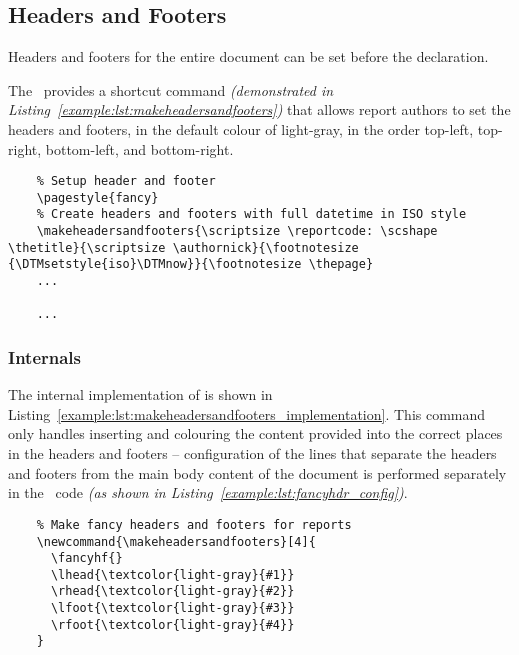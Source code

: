 \subsection{Headers and Footers}
Headers and footers for the entire document can be set before the  declaration.

The \uswdwmspkg\ provides a shortcut command \textit{(demonstrated in Listing~\ref{example:lst:makeheadersandfooters})} that allows report authors to set the headers and footers, in the default colour of \textcolor{light-gray}{light-gray}, in the order top-left, top-right, bottom-left, and bottom-right.

\begin{listing}[H]
  \captionsetup{skip=\skiplistingcaptionlen}
  \begin{verbatim}
    % Setup header and footer
    \pagestyle{fancy}
    % Create headers and footers with full datetime in ISO style
    \makeheadersandfooters{\scriptsize \reportcode: \scshape \thetitle}{\scriptsize \authornick}{\footnotesize {\DTMsetstyle{iso}\DTMnow}}{\footnotesize \thepage}
    ...
    
    ...
  \end{verbatim}
  \caption{\texttt{\textbackslash makeheadersandfooters} command example}
  \label{example:lst:makeheadersandfooters}
\end{listing}

\subsubsection*{Internals}

The internal implementation of  is shown in Listing~\ref{example:lst:makeheadersandfooters_implementation}. This command only handles inserting and colouring the content provided into the correct places in the headers and footers -- configuration of the lines that separate the headers and footers from the main body content of the document is performed separately in the \uswdwmspkg\ code \textit{(as shown in Listing~\ref{example:lst:fancyhdr_config})}.

\begin{listing}[H]
  \captionsetup{skip=\skiplistingcaptionlen}
  \begin{verbatim}
    % Make fancy headers and footers for reports
    \newcommand{\makeheadersandfooters}[4]{
      \fancyhf{}
      \lhead{\textcolor{light-gray}{#1}}
      \rhead{\textcolor{light-gray}{#2}}
      \lfoot{\textcolor{light-gray}{#3}}
      \rfoot{\textcolor{light-gray}{#4}}
    }
  \end{verbatim}
  \caption{\texttt{\textbackslash makeheadersandfooters} internal implementation}
  \label{example:lst:makeheadersandfooters_implementation}
\end{listing}

